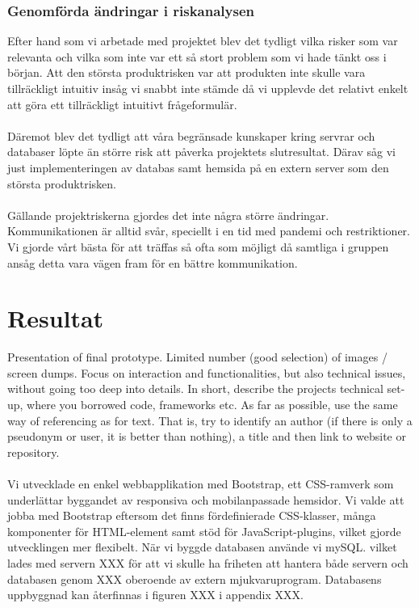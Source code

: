 \documentclass[12pt]{article}
\begin{document}
 \subsubsection{Genomförda ändringar i riskanalysen}Efter hand som vi arbetade med projektet blev det tydligt vilka risker som var relevanta och vilka som inte var ett så stort problem som vi hade tänkt oss i början. Att den största produktrisken var att produkten inte skulle vara tillräckligt intuitiv insåg vi snabbt inte stämde då vi upplevde det relativt enkelt att göra ett tillräckligt intuitivt frågeformulär.\\\\
 Däremot blev det tydligt att våra begränsade kunskaper kring servrar och databaser löpte än större risk att påverka projektets slutresultat. Därav såg vi just implementeringen av databas samt hemsida på en extern server som den största produktrisken.\\\\
 Gällande projektriskerna gjordes det inte några större ändringar. Kommunikationen är alltid svår, speciellt i en tid med pandemi och restriktioner. Vi gjorde vårt bästa för att träffas så ofta som möjligt då samtliga i gruppen ansåg detta vara vägen fram för en bättre kommunikation. 
 

 



\section{Resultat}
Presentation of final prototype. Limited number (good selection) of images / screen dumps. Focus on interaction and functionalities, but also technical issues, without going too deep into details. In short, describe the projects technical set-up, where you borrowed code, frameworks etc. As far as possible, use the same way of referencing as for text. That is, try to identify an author (if there is only a pseudonym or user, it is better than nothing), a title and then link to website or repository.\\\\
Vi utvecklade en enkel webbapplikation med Bootstrap, ett CSS-ramverk som underlättar byggandet av responsiva och mobilanpassade hemsidor. Vi valde att jobba med Bootstrap eftersom det finns fördefinierade CSS-klasser, många komponenter för HTML-element samt stöd för JavaScript-plugins, vilket gjorde utvecklingen mer flexibelt. När vi byggde databasen använde vi mySQL. vilket  lades med servern XXX för att vi skulle ha friheten att hantera både servern och databasen genom XXX oberoende av extern mjukvaruprogram. Databasens uppbyggnad kan återfinnas i figuren XXX i appendix XXX.\\\\
\end{document}

